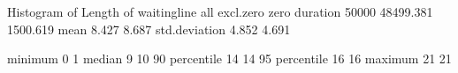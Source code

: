 \documentclass[letterpaper,10pt,english]{sphinxmanual}
\begin{document}
\begin{sphinxVerbatim}[commandchars=\\\{\}]
Histogram of Length of waitingline
                        all    excl.zero         zero
\PYGZhy{}\PYGZhy{}\PYGZhy{}\PYGZhy{}\PYGZhy{}\PYGZhy{}\PYGZhy{}\PYGZhy{}\PYGZhy{}\PYGZhy{}\PYGZhy{}\PYGZhy{}\PYGZhy{}\PYGZhy{} \PYGZhy{}\PYGZhy{}\PYGZhy{}\PYGZhy{}\PYGZhy{}\PYGZhy{}\PYGZhy{}\PYGZhy{}\PYGZhy{}\PYGZhy{}\PYGZhy{}\PYGZhy{} \PYGZhy{}\PYGZhy{}\PYGZhy{}\PYGZhy{}\PYGZhy{}\PYGZhy{}\PYGZhy{}\PYGZhy{}\PYGZhy{}\PYGZhy{}\PYGZhy{}\PYGZhy{} \PYGZhy{}\PYGZhy{}\PYGZhy{}\PYGZhy{}\PYGZhy{}\PYGZhy{}\PYGZhy{}\PYGZhy{}\PYGZhy{}\PYGZhy{}\PYGZhy{}\PYGZhy{}
duration          50000        48499.381     1500.619
mean                  8.427        8.687
std.deviation         4.852        4.691

minimum               0            1
median                9           10
90\PYGZpc{} percentile       14           14
95\PYGZpc{} percentile       16           16
maximum              21           21


\end{sphinxVerbatim}
\end{document}
